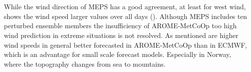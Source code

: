 \\
\\
While the wind direction of MEPS has a good agreement, at least for west wind, shows the wind speed larger values over all days (). Although MEPS includes ten perturbed ensemble members the insufficiency of AROME-MetCoOp too high wind prediction in extreme situations is not resolved. %
As \cite{muller_arome-metcoop:_2017} mentioned are higher wind speeds in general better forecasted in AROME-MetCoOp than in ECMWF, which is an advantage for small scale forecast models. Especially in Norway, where the topography changes from sea to mountains. 


